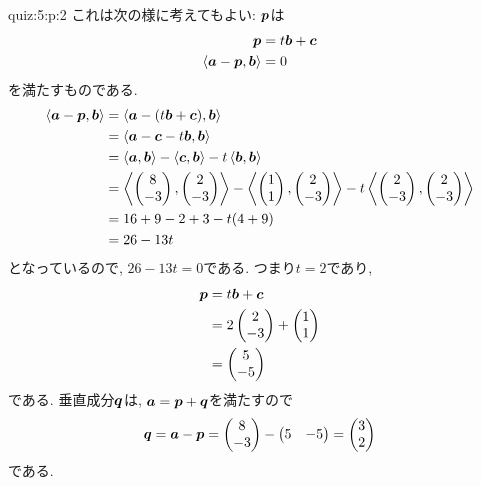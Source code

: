 \begin{answerof}{quiz:5:p:2}
  これは次の様に考えてもよい:
  $\boldsymbol{p}$は
  \begin{align*}
    \boldsymbol{p}&=t\boldsymbol{b}+\boldsymbol{c}\\
    \Braket{\boldsymbol{a}-\boldsymbol{p},\boldsymbol{b}}&=0
  \end{align*}
  を満たすものである.
  \begin{align*}
    \Braket{\boldsymbol{a}-\boldsymbol{p},\boldsymbol{b}}&=
    \Braket{\boldsymbol{a}-(t\boldsymbol{b}+\boldsymbol{c}),\boldsymbol{b}}\\
    &=\Braket{\boldsymbol{a}-\boldsymbol{c}-t\boldsymbol{b},\boldsymbol{b}}\\
    &=\Braket{\boldsymbol{a},\boldsymbol{b}}-\Braket{\boldsymbol{c},\boldsymbol{b}}-t\Braket{\boldsymbol{b},\boldsymbol{b}}\\
    &=\Braket{\begin{pmatrix}8\\-3\end{pmatrix},\begin{pmatrix}2\\-3\end{pmatrix}}-\Braket{\begin{pmatrix}1\\1\end{pmatrix},\begin{pmatrix}2\\-3\end{pmatrix}}-t\Braket{\begin{pmatrix}2\\-3\end{pmatrix},\begin{pmatrix}2\\-3\end{pmatrix}}\\
    &=16+9-2+3-t(4+9)\\
    &=26-13t
  \end{align*}
  となっているので, $26-13t=0$である.
  つまり$t=2$であり,
  \begin{align*}
    \boldsymbol{p}&=t\boldsymbol{b}+\boldsymbol{c}\\
    &=2\begin{pmatrix}2\\-3\end{pmatrix}+\begin{pmatrix}1\\1\end{pmatrix}\\
    &=\begin{pmatrix}5\\-5\end{pmatrix}
  \end{align*}
  である.
  垂直成分$\boldsymbol{q}$は,
  $\boldsymbol{a}=\boldsymbol{p}+\boldsymbol{q}$を満たすので
  \begin{align*}
    \boldsymbol{q}=\boldsymbol{a}-\boldsymbol{p}
    =\begin{pmatrix}8\\-3\end{pmatrix}-\begin{pmatrix}5&-5\end{pmatrix}
    =\begin{pmatrix}3\\2\end{pmatrix}
  \end{align*}
  である.
\end{answerof}


